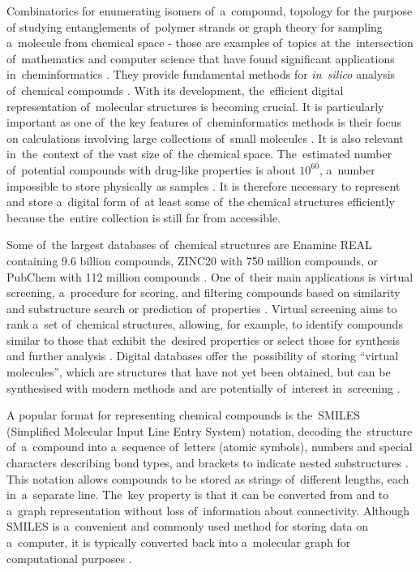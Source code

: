 Combinatorics for enumerating isomers of~a~compound, topology for the purpose of studying entanglements of~polymer strands or graph theory for sampling a~molecule from chemical space - those are examples of~topics at the~intersection of~mathematics and computer science that have found significant applications in~cheminformatics \cite{1995mathematical}. They provide fundamental methods for \emph{in~silico} analysis of~chemical compounds \cite{1995mathematical}. With its development, the~efficient digital representation of~molecular structures is becoming crucial. It is particularly important as one of~the key features of~cheminformatics methods is their focus on calculations involving large collections of~small molecules \cite{leach2007chemoinformatics}. It is also relevant in~the~context of~the vast size of~the chemical space. The~estimated number of~potential compounds with drug-like properties is about \( 10^{60} \), a~number impossible to store physically as samples \cite{leach2007chemoinformatics}. It is therefore necessary to represent and store a~digital form of~at least some of~the chemical structures efficiently because the~entire collection is still far from accessible.

Some of~the largest databases of~chemical structures are Enamine REAL containing 9.6 billion compounds, ZINC20 with 750 million compounds, or PubChem with 112 million compounds \cite{kim2025pubchem, 2025enamine, 2025zinc}. One of~their main applications is virtual screening, a~procedure for scoring, and filtering compounds based on similarity and substructure search or prediction of~properties \cite{leach2007chemoinformatics}. Virtual screening aims to rank a~set of~chemical structures, allowing, for example, to identify compounds similar to those that exhibit the~desired properties or select those for synthesis and further analysis \cite{brown2015medicinal}. Digital databases offer the~possibility of~storing ``virtual molecules'', which are structures that have not yet been obtained, but can be synthesised with modern methods and are potentially of~interest in~screening \cite{leach2007chemoinformatics}.

A popular format for representing chemical compounds is the~SMILES (Simplified Molecular Input Line Entry System) notation, decoding the~structure of~a~compound into a~sequence of~letters (atomic symbols), numbers and special characters describing bond types, and brackets to indicate nested substructures \cite{brown2015medicinal, 2025smiles}. This notation allows compounds to be stored as strings of~different lengths, each in~a~separate line. The~key property is that it can be converted from and to a~graph representation without loss of~information about connectivity. Although SMILES is a~convenient and commonly used method for storing data on a~computer, it is typically converted back into a~molecular graph for computational purposes \cite{leach2007chemoinformatics}.

